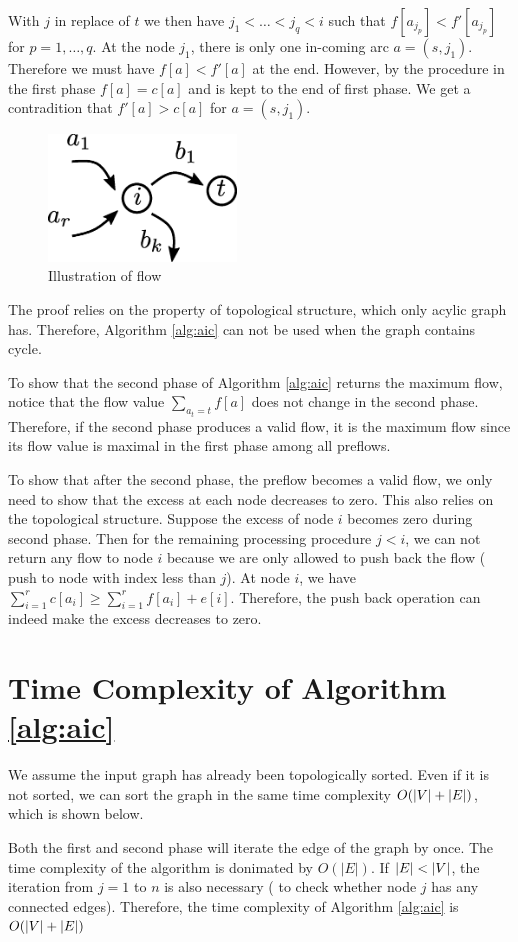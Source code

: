 \documentclass{article}
\DeclarePairedDelimiter\abs{\lvert}{\rvert}
\theoremstyle{definition}
\begin{document}
With $j$ in replace of $t$ we then have $j_1 < \dots < j_q < i$ such that $f[a_{j_p}] < f'[a_{j_p}]$ for $p=1, \dots, q$. 
At the node $j_1$, there is only one in-coming arc $a=(s, j_1)$. Therefore we must have $f[a] < f'[a]$ at the end. However, by the procedure in the first phase $f[a] = c[a]$ and is kept to the end of first phase. We get a contradition that $f'[a] > c[a]$ for $a=(s,j_1)$. 
\begin{figure}[!ht]
\centering
\includegraphics[width=5cm]{maxflow_proof.eps}
\caption{Illustration of flow}\label{maxflow_proof}
\end{figure}

The proof relies on the property of topological structure, which only acylic graph has.  Therefore,  Algorithm \ref{alg:aic} can not be used when the graph contains cycle.

To show that the second phase of Algorithm \ref{alg:aic} returns the maximum flow, notice that the flow value $\sum_{a_t = t} f[a]$ does not change in the second phase. Therefore, if the second phase produces a valid flow, it is the maximum flow since its flow value is maximal in the first phase among all preflows.

To show that after the second phase, the preflow becomes a valid flow, we only need to show that the excess at each node decreases to zero. This also relies on the topological structure. Suppose the excess of node $i$ becomes zero during second phase. Then for the remaining processing procedure $j<i$, we can not return any flow to node $i$ because we are only allowed to push back the flow ( push to node with index less than $j$).  At node $i$, we have $ \sum_{i=1}^r c[a_i] \geq \sum_{i=1}^r f[a_i] + e[i]$. Therefore, the push back operation can indeed make the excess decreases to zero. 
\section{Time Complexity of Algorithm \ref{alg:aic}}
We assume the input graph has already been topologically sorted. Even if it is not sorted, we can sort the graph in the same time complexity $O(\abs{V} + \abs{E})$, which is shown below.

Both the first and second phase will iterate the edge of the graph by once. The time complexity of the algorithm is donimated by $O(|E|)$.  If $\abs{E} < \abs{V}$, the iteration from $j=1$ to $n$ is also necessary ( to check whether node $j$ has any connected edges). Therefore, the time complexity of Algorithm \ref{alg:aic} is $O(\abs{V} + \abs{E}) $
\end{document}
